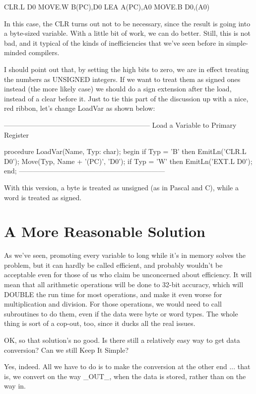 \documentclass[float=false, crop=false]{standalone}
\begin{document}
     CLR.L D0
     MOVE.W B(PC),D0
     LEA  A(PC),A0
     MOVE.B D0,(A0)


In this case, the CLR turns out not to be necessary, since the result is going
into a byte-sized variable. With a little bit of work, we can do better. Still,
this is not bad, and it typical of the kinds of inefficiencies that we've seen
before in simple- minded compilers.

I should point out that, by setting the high bits to zero, we are in effect
treating the numbers as UNSIGNED integers. If we want to treat them as signed
ones instead (the more likely case) we should do a sign extension after the
load, instead of a clear before it. Just to tie this part of the discussion up
with a nice, red ribbon, let's change LoadVar as shown below:


{---------------------------------------------------------------}
{ Load a Variable to Primary Register }

procedure LoadVar(Name, Typ: char);
begin
   if Typ = 'B' then
      EmitLn('CLR.L D0');
   Move(Typ, Name + '(PC)', 'D0');
   if Typ = 'W' then
      EmitLn('EXT.L D0');
end;
{---------------------------------------------------------------}


With this version, a byte is treated as unsigned (as in Pascal and C), while a
word is treated as signed.


\section{A More Reasonable Solution}

As we've seen, promoting every variable to long while it's in memory solves the
problem, but it can hardly be called efficient, and probably wouldn't be
acceptable even for those of us who claim be unconcerned about efficiency. It
will mean that all arithmetic operations will be done to 32-bit accuracy, which
will DOUBLE the run time for most operations, and make it even worse for
multiplication and division. For those operations, we would need to call
subroutines to do them, even if the data were byte or word types. The whole
thing is sort of a cop-out, too, since it ducks all the real issues.

OK, so that solution's no good. Is there still a relatively easy way to get data
conversion? Can we still Keep It Simple?

Yes, indeed. All we have to do is to make the conversion at the other end ...
that is, we convert on the way _OUT_, when the data is stored, rather than on
the way in.
\end{document}
